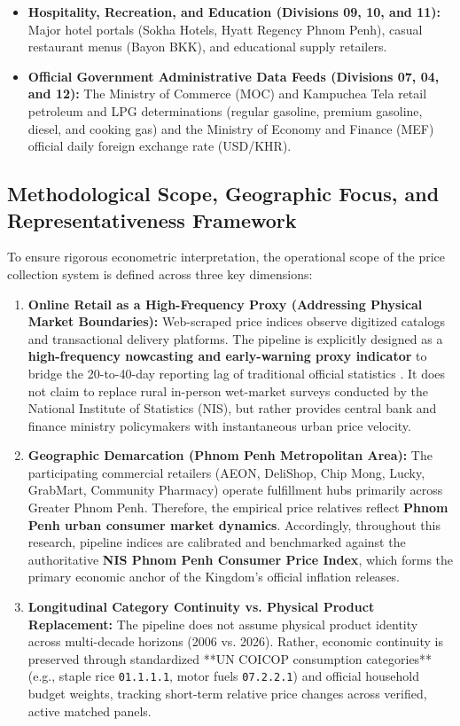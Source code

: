 \begin{itemize}
    \item \textbf{Hospitality, Recreation, and Education (Divisions 09, 10, and 11):} Major hotel portals (Sokha Hotels, Hyatt Regency Phnom Penh), casual restaurant menus (Bayon BKK), and educational supply retailers.
    \item \textbf{Official Government Administrative Data Feeds (Divisions 07, 04, and 12):} The Ministry of Commerce (MOC) and Kampuchea Tela retail petroleum and LPG determinations (regular gasoline, premium gasoline, diesel, and cooking gas) and the Ministry of Economy and Finance (MEF) official daily foreign exchange rate (USD/KHR).
\end{itemize}

\subsection{Methodological Scope, Geographic Focus, and Representativeness Framework}
\hs To ensure rigorous econometric interpretation, the operational scope of the price collection system is defined across three key dimensions:
\begin{enumerate}
    \item \textbf{Online Retail as a High-Frequency Proxy (Addressing Physical Market Boundaries):} Web-scraped price indices observe digitized catalogs and transactional delivery platforms. The pipeline is explicitly designed as a \textbf{high-frequency nowcasting and early-warning proxy indicator} to bridge the 20-to-40-day reporting lag of traditional official statistics \citep{cavallo2016billion, aparicio2021targeted}. It does not claim to replace rural in-person wet-market surveys conducted by the National Institute of Statistics (NIS), but rather provides central bank and finance ministry policymakers with instantaneous urban price velocity.
    \item \textbf{Geographic Demarcation (Phnom Penh Metropolitan Area):} The participating commercial retailers (AEON, DeliShop, Chip Mong, Lucky, GrabMart, Community Pharmacy) operate fulfillment hubs primarily across Greater Phnom Penh. Therefore, the empirical price relatives reflect \textbf{Phnom Penh urban consumer market dynamics}. Accordingly, throughout this research, pipeline indices are calibrated and benchmarked against the authoritative \textbf{NIS Phnom Penh Consumer Price Index}, which forms the primary economic anchor of the Kingdom's official inflation releases.
    \item \textbf{Longitudinal Category Continuity vs. Physical Product Replacement:} The pipeline does not assume physical product identity across multi-decade horizons (2006 vs. 2026). Rather, economic continuity is preserved through standardized **UN COICOP consumption categories** (e.g., staple rice \texttt{01.1.1.1}, motor fuels \texttt{07.2.2.1}) and official household budget weights, tracking short-term relative price changes across verified, active matched panels.
\end{enumerate}


